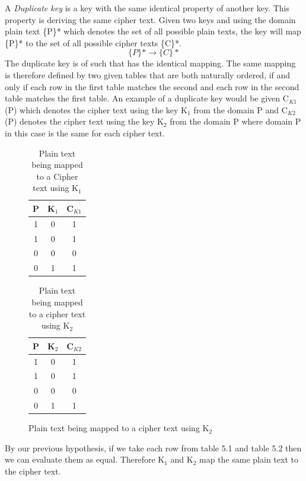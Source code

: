 \documentclass[11pt,a4paper, notitlepage]{report}
\begin{document}
A \emph{Duplicate key} is a key with the same identical property of another key. This property is deriving the same cipher text. Given two keys and using the domain plain text \{P\}* which denotes the set of all possible plain texts, the key will map \{P\}* to the set of all possible cipher texts \{C\}*.
\begin{displaymath}
\{P\}* \rightarrow \{C\}*
\end{displaymath}
The duplicate key is of such that has the identical mapping. The same mapping is therefore defined by two given tables that are both naturally ordered, if and only if each row in the first table matches the second and each row in the second table matches the first table.
An example of a duplicate key would be given C$_{K1}$(P) which denotes the cipher text using the key K$_1$ from the domain P and C$_{K2}$(P) denotes the cipher text using the key K$_2$ from the domain P where domain P in this case is the same for each cipher text.


\begin{figure}
\begin{table}[H]
\centering
\label{tab:C1}
\begin{tabular}{|c|c|c|}
\hline
P & K$_1$ & C$_{K1}$ \\ \hline
1 & 0 & 1 \\
1 & 0 & 1 \\
0 & 0 & 0 \\
0 & 1 & 1 \\
\hline
\end{tabular}
\caption{Plain text being mapped to a Cipher text using K$_1$}
\end{table}

\begin{table}[H]
\centering
\label{tab:C2}
\begin{tabular}{|c|c|c|}
\hline
P & K$_2$ & C$_{K2}$ \\ \hline
1 & 0 & 1 \\
1 & 0 & 1 \\
0 & 0 & 0 \\
0 & 1 & 1 \\
\hline
\end{tabular}
\caption{Plain text being mapped to a cipher text using K$_2$}
\end{table}
\end{figure}

By our previous hypothesis, if we take each row from table 5.1 and table 5.2 then we can evaluate them as equal. Therefore K$_1$ and K$_2$ map the same plain text to the cipher text.
\end{document}
